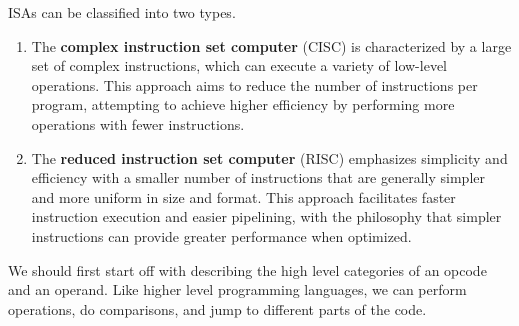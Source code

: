   \begin{example}
    ISAs can be classified into two types. 
    \begin{enumerate} 
      \item The \textbf{complex instruction set computer} (CISC) is characterized by a large set of complex instructions, which can execute a variety of low-level operations. This approach aims to reduce the number of instructions per program, attempting to achieve higher efficiency by performing more operations with fewer instructions.
      \item The \textbf{reduced instruction set computer} (RISC) emphasizes simplicity and efficiency with a smaller number of instructions that are generally simpler and more uniform in size and format. This approach facilitates faster instruction execution and easier pipelining, with the philosophy that simpler instructions can provide greater performance when optimized.
    \end{enumerate}
  \end{example}

  We should first start off with describing the high level categories of an opcode and an operand. Like higher level programming languages, we can perform operations, do comparisons, and jump to different parts of the code. 

